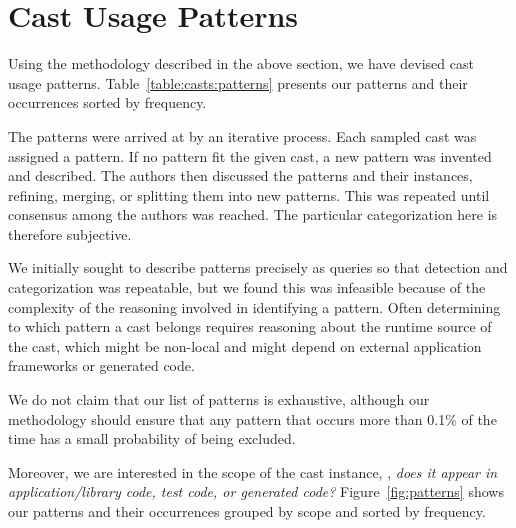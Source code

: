 
\section{Cast Usage Patterns}
\label{sec:casts:patterns}

Using the methodology described in the above section,
we have devised \nPattern{} cast usage patterns.
Table~\ref{table:casts:patterns} presents our patterns and their occurrences sorted by frequency.




The patterns were arrived at by an iterative process.
Each sampled cast was assigned a pattern.
If no pattern fit the given cast,
a new pattern was invented and described.
The authors then discussed the patterns and their instances,
refining, merging, or splitting them into new patterns.
This was repeated until consensus among the authors was reached.
The particular categorization here is therefore subjective.

We initially sought to describe patterns precisely as \ql{} queries so that
detection and categorization was repeatable,
but we found this was infeasible because of the complexity of the reasoning 
involved in identifying a pattern.
Often determining to which pattern a cast belongs
requires reasoning about the runtime source of the cast, which might be
non-local and might depend on external application frameworks or generated
code.

We do not claim that our list of patterns is exhaustive, although our
methodology should ensure that any pattern that occurs more than 0.1\% of the
time has a small probability of being excluded.

Moreover, we are interested in the scope of the cast instance,
\ie, \emph{does it appear in application/library code, test code, or generated code?}
Figure~\ref{fig:patterns} shows our patterns and their occurrences grouped by scope and sorted by frequency.

